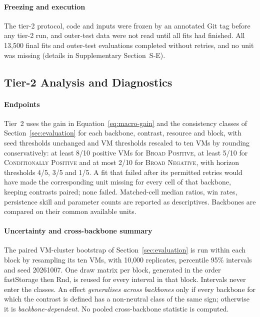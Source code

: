 \documentclass[5p,twocolumn]{elsarticle}
\begin{document}
\paragraph{Freezing and execution} The tier-2 protocol, code and inputs
were frozen by an annotated Git tag before any tier-2 run, and outer-test
data were not read until all fits had finished. All 13{,}500 final fits and
outer-test evaluations completed without retries, and no unit was missing
(details in Supplementary Section~S-E).

\subsection{Tier-2 Analysis and Diagnostics}
\label{sec:tier2-analysis}

\paragraph{Endpoints} Tier~2 uses the gain in
Equation~\ref{eq:macro-gain} and the consistency classes of
Section~\ref{sec:evaluation} for each backbone, contrast, resource and
block, with seed thresholds unchanged and VM thresholds rescaled to ten VMs
by rounding conservatively: at least 8/10 positive VMs for
\textsc{Broad Positive}, at least 5/10 for \textsc{Conditionally Positive}
and at most 2/10 for \textsc{Broad Negative}, with horizon thresholds 4/5,
3/5 and 1/5. A fit that failed after its permitted retries would have made
the corresponding unit missing for every cell of that backbone, keeping
contrasts paired; none failed. Matched-cell median ratios, win rates,
persistence skill and parameter counts are reported as descriptives.
Backbones are compared on their common available units.

\paragraph{Uncertainty and cross-backbone summary} The paired VM-cluster
bootstrap of Section~\ref{sec:evaluation} is run within each block by
resampling its ten VMs, with 10{,}000 replicates, percentile 95\% intervals
and seed 20261007. One draw matrix per block, generated in the order
fastStorage then Rnd, is reused for every interval in that block. Intervals
never enter the classes. An effect \emph{generalises across backbones} only
if every backbone for which the contrast is defined has a non-neutral class
of the same sign; otherwise it is \emph{backbone-dependent}. No pooled
cross-backbone statistic is computed.
\end{document}
